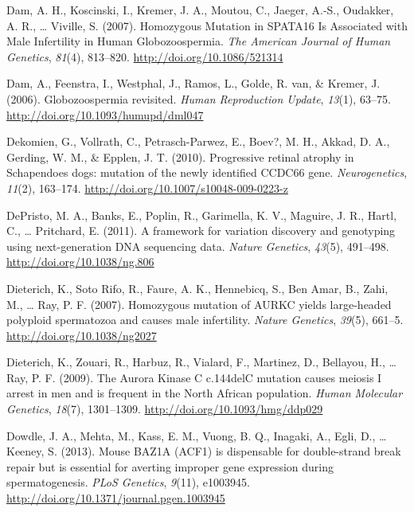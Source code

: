 \documentclass[12pt,twoside]{reedthesis}
\theoremstyle{definition}
\theoremstyle{definition}
\theoremstyle{remark}
\begin{document}
  \hypertarget{ref-Dam2007a}{}
  Dam, A. H., Koscinski, I., Kremer, J. A., Moutou, C., Jaeger, A.-S.,
  Oudakker, A. R., \ldots{} Viville, S. (2007). Homozygous Mutation in
  SPATA16 Is Associated with Male Infertility in Human Globozoospermia.
  \emph{The American Journal of Human Genetics}, \emph{81}(4), 813--820.
  \url{http://doi.org/10.1086/521314}
  
  \hypertarget{ref-Dam2006}{}
  Dam, A., Feenstra, I., Westphal, J., Ramos, L., Golde, R. van, \&
  Kremer, J. (2006). Globozoospermia revisited. \emph{Human Reproduction
  Update}, \emph{13}(1), 63--75.
  \url{http://doi.org/10.1093/humupd/dml047}
  
  \hypertarget{ref-Dekomien2010}{}
  Dekomien, G., Vollrath, C., Petrasch-Parwez, E., Boev?, M. H., Akkad, D.
  A., Gerding, W. M., \& Epplen, J. T. (2010). Progressive retinal atrophy
  in Schapendoes dogs: mutation of the newly identified CCDC66 gene.
  \emph{Neurogenetics}, \emph{11}(2), 163--174.
  \url{http://doi.org/10.1007/s10048-009-0223-z}
  
  \hypertarget{ref-DePristo2011}{}
  DePristo, M. A., Banks, E., Poplin, R., Garimella, K. V., Maguire, J.
  R., Hartl, C., \ldots{} Pritchard, E. (2011). A framework for variation
  discovery and genotyping using next-generation DNA sequencing data.
  \emph{Nature Genetics}, \emph{43}(5), 491--498.
  \url{http://doi.org/10.1038/ng.806}
  
  \hypertarget{ref-Dieterich2007}{}
  Dieterich, K., Soto Rifo, R., Faure, A. K., Hennebicq, S., Ben Amar, B.,
  Zahi, M., \ldots{} Ray, P. F. (2007). Homozygous mutation of AURKC
  yields large-headed polyploid spermatozoa and causes male infertility.
  \emph{Nature Genetics}, \emph{39}(5), 661--5.
  \url{http://doi.org/10.1038/ng2027}
  
  \hypertarget{ref-Dieterich2009}{}
  Dieterich, K., Zouari, R., Harbuz, R., Vialard, F., Martinez, D.,
  Bellayou, H., \ldots{} Ray, P. F. (2009). The Aurora Kinase C c.144delC
  mutation causes meiosis I arrest in men and is frequent in the North
  African population. \emph{Human Molecular Genetics}, \emph{18}(7),
  1301--1309. \url{http://doi.org/10.1093/hmg/ddp029}
  
  \hypertarget{ref-Dowdle2013}{}
  Dowdle, J. A., Mehta, M., Kass, E. M., Vuong, B. Q., Inagaki, A., Egli,
  D., \ldots{} Keeney, S. (2013). Mouse BAZ1A (ACF1) is dispensable for
  double-strand break repair but is essential for averting improper gene
  expression during spermatogenesis. \emph{PLoS Genetics}, \emph{9}(11),
  e1003945. \url{http://doi.org/10.1371/journal.pgen.1003945}
  
\end{document}
